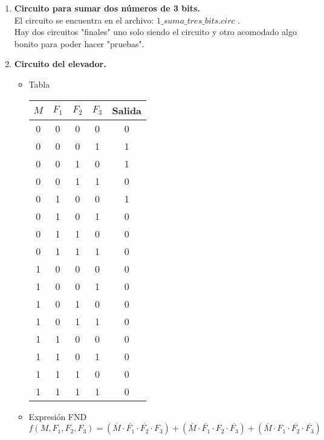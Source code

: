 \documentclass[12pt]{article}
\begin{document}
\begin{enumerate}

  \item {\bf Circuito para sumar dos números de 3 bits.} \\
  	El circuito se encuentra en el archivo: $1\_suma\_tres\_bits.circ$ .\\
  	Hay dos circuitos "finales" uno solo siendo el circuito y otro acomodado algo bonito para poder hacer "pruebas".
  	
  \item {\bf Circuito del elevador.}
  	\begin{itemize}
  		\item Tabla
  			\begin{table}[h!]
  				\centering
  				\begin{tabular}{|c|c|c|c|c|}
  					\hline
  					$M$ & $F_1$ & $F_2$ & $F_3$ & Salida \\ \hline
  					0 & 0  & 0  & 0  & 0      \\ \hline
  					0 & 0  & 0  & 1  & 1      \\ \hline
  					0 & 0  & 1  & 0  & 1      \\ \hline
  					0 & 0  & 1  & 1  & 0      \\ \hline
  					0 & 1  & 0  & 0  & 1      \\ \hline
  					0 & 1  & 0  & 1  & 0      \\ \hline
  					0 & 1  & 1  & 0  & 0      \\ \hline
  					0 & 1  & 1  & 1  & 0      \\ \hline
  					1 & 0  & 0  & 0  & 0      \\ \hline
  					1 & 0  & 0  & 1  & 0      \\ \hline
  					1 & 0  & 1  & 0  & 0      \\ \hline
  					1 & 0  & 1  & 1  & 0      \\ \hline
  					1 & 1  & 0  & 0  & 0      \\ \hline
  					1 & 1  & 0  & 1  & 0      \\ \hline
  					1 & 1  & 1  & 0  & 0      \\ \hline
  					1 & 1  & 1  & 1  & 0      \\ \hline
  				\end{tabular}
  			\end{table}
  		\item Expresión FND \\
  			$f(M,F_1,F_2,F_3) = (\overline{M}\cdot\overline{F_1}\cdot\overline{F_2}\cdot F_3) + (\overline{M}\cdot\overline{F_1}\cdot F_2\cdot\overline{F_3}) + (\overline{M}\cdot F_1\cdot\overline{F_2}\cdot\overline{F_3})$

\end{itemize}
\end{enumerate}
\end{document}
